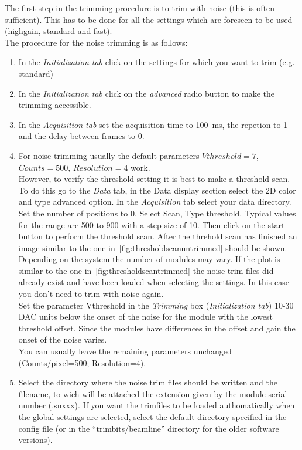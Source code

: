 The first step in the trimming procedure is to trim with noise (this is often sufficient). This has to be done for all the settings which are foreseen to be used (highgain, standard and fast).\\
The procedure for the noise trimming is as follows:
\begin{enumerate}
\item In the \textit{Initialization tab} click on the settings for which you want to trim (e.g. standard)
\item In the \textit{Initialization tab} click on the \textit{advanced} radio button to make the trimming accessible.
\item  In the \textit{Acquisition tab} set the acquisition time to 100~ms, the repetion to 1 and the delay between frames to 0.
\item For noise trimming usually the default parameters $Vthreshold=7$, $Counts=500$, $Resolution=4$ work.\\
However, to verify the threshold setting it is best to make a threshold scan. To do this go to the \textit{Data} tab, in the Data display section select the 2D color and type advanced option. In the \textit{Acquisition} tab select your data directory. Set the number of positions to 0. Select Scan, Type threshold. Typical values for the range are 500 to 900 with a step size of 10. Then click on the start button to perform the threshold scan. After the threhold scan has finished an image similar to the one in~\ref{fig:thresholdscanuntrimmed} should be shown. Depending on the system the number of modules may vary. If the plot is similar to the one in~\ref{fig:thresholdscantrimmed} the noise trim files did already exist and have been loaded when selecting the settings. In this case you don't need to trim with noise again.\\
Set the parameter Vthreshold in the \textit{Trimming} box (\textit{Initialization tab}) 10-30 DAC units below the onset of the noise for the module with the lowest threshold offset. Since the modules have differences in the offset and gain the onset of the noise varies. \\
You can usually leave the remaining parameters unchanged (Counts/pixel=500; Resolution=4).
\item Select the directory where the noise trim files should be written and the filename, to wich will be attached the extension given by the module serial number (.snxxx). If you want the trimfiles to be loaded authomatically when the global settings are selected, select the default directory specified in the config file (or in the ``trimbits/beamline'' directory for the older software versions). 

\end{enumerate}
